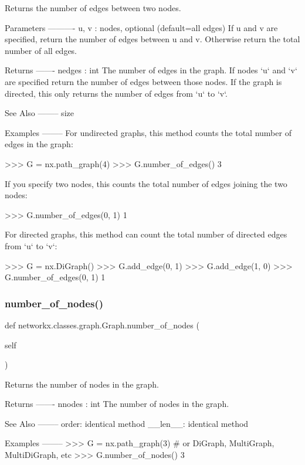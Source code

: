 \begin{DoxyVerb}Returns the number of edges between two nodes.

Parameters
----------
u, v : nodes, optional (default=all edges)
    If u and v are specified, return the number of edges between
    u and v. Otherwise return the total number of all edges.

Returns
-------
nedges : int
    The number of edges in the graph.  If nodes `u` and `v` are
    specified return the number of edges between those nodes. If
    the graph is directed, this only returns the number of edges
    from `u` to `v`.

See Also
--------
size

Examples
--------
For undirected graphs, this method counts the total number of
edges in the graph:

>>> G = nx.path_graph(4)
>>> G.number_of_edges()
3

If you specify two nodes, this counts the total number of edges
joining the two nodes:

>>> G.number_of_edges(0, 1)
1

For directed graphs, this method can count the total number of
directed edges from `u` to `v`:

>>> G = nx.DiGraph()
>>> G.add_edge(0, 1)
>>> G.add_edge(1, 0)
>>> G.number_of_edges(0, 1)
1\end{DoxyVerb}
 \mbox{\label{classnetworkx_1_1classes_1_1graph_1_1Graph_ad5cb93d5f9aea0bbe23ca50ac0b3c1f9}} 
\subsubsection{\texorpdfstring{number\+\_\+of\+\_\+nodes()}{number\_of\_nodes()}}
{\footnotesize\ttfamily def networkx.\+classes.\+graph.\+Graph.\+number\+\_\+of\+\_\+nodes (\begin{DoxyParamCaption}\item[{}]{self }\end{DoxyParamCaption})}

\begin{DoxyVerb}Returns the number of nodes in the graph.

Returns
-------
nnodes : int
    The number of nodes in the graph.

See Also
--------
order: identical method
__len__: identical method

Examples
--------
>>> G = nx.path_graph(3)  # or DiGraph, MultiGraph, MultiDiGraph, etc
>>> G.number_of_nodes()
3
\end{DoxyVerb}
 \mbox{\label{classnetworkx_1_1classes_1_1graph_1_1Graph_abe8aa36ed63c7eaf7f8db16d760cc834}} 
